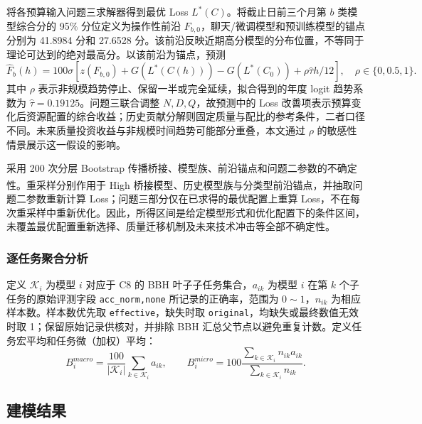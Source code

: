 \documentclass[bwprint]{gmcmthesis}
\numberwithin{equation}{section}
\numberwithin{figure}{section}
\numberwithin{table}{section}
\begin{document}
        将各预算输入问题三求解器得到最优 Loss $L^*(C)$。将截止日前三个月第 $b$ 类模型综合分的 95\% 分位定义为操作性前沿 $F_{b,0}$，聊天/微调模型和预训练模型的锚点分别为 41.8984 分和 27.6528 分。该前沿反映近期高分模型的分布位置，不等同于理论可达到的绝对最高分。以该前沿为锚点，预测
        \begin{equation}
        \widehat F_b(h)=100\sigma\!\left[z(F_{b,0})+G(L^*(C(h)))-G(L^*(C_0))
        +\rho\widehat\tau h/12\right],\quad \rho\in\{0,0.5,1\}.
        \label{eq:p4_forecast}
        \end{equation}
        其中 $\rho$ 表示非规模趋势停止、保留一半或完全延续，拟合得到的年度 logit 趋势系数为 $\widehat\tau=0.19125$。问题三联合调整 $N,D,Q$，故预测中的 Loss 改善项表示预算变化后资源配置的综合收益；历史贡献分解则固定质量与配比的参考条件，二者口径不同。未来质量投资收益与非规模时间趋势可能部分重叠，本文通过 $\rho$ 的敏感性情景展示这一假设的影响。

        采用 200 次分层 Bootstrap 传播桥接、模型族、前沿锚点和问题二参数的不确定性\textsuperscript{\cite{efron1979bootstrap}}。重采样分别作用于 High 桥接模型、历史模型族与分类型前沿锚点，并抽取问题二参数重新计算 Loss；问题三部分仅在已求得的最优配置上重算 Loss，不在每次重采样中重新优化。因此，所得区间是给定模型形式和优化配置下的条件区间，未覆盖最优配置重新选择、质量迁移机制及未来技术冲击等全部不确定性。

        \subsubsection{逐任务聚合分析}
        定义 $\mathcal K_i$ 为模型 $i$ 对应于 C8 的 BBH 叶子子任务集合，$a_{ik}$ 为模型 $i$ 在第 $k$ 个子任务的原始评测字段 \texttt{acc\_norm,none} 所记录的正确率，范围为 $0\sim1$，$n_{ik}$ 为相应样本数。样本数优先取 \texttt{effective}，缺失时取 \texttt{original}，均缺失或最终数值无效时取 1；保留原始记录供核对，并排除 BBH 汇总父节点以避免重复计数。定义任务宏平均和任务微（加权）平均：
        \begin{equation}
        B_i^{macro}=\frac{100}{|\mathcal K_i|}\sum_{k\in\mathcal K_i}a_{ik},\qquad
        B_i^{micro}=100\frac{\sum_{k\in\mathcal K_i} n_{ik}a_{ik}}{\sum_{k\in\mathcal K_i} n_{ik}}.
        \label{eq:p4_aggregation}
        \end{equation}

    \subsection{建模结果}
\end{document}
